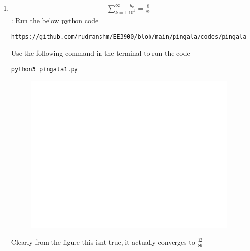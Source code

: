 \documentclass[journal,12pt,twocolumn]{IEEEtran}
\renewcommand\thesection{\arabic{section}}
\begin{document}
\begin{enumerate}[label=\thesection.\arabic*
,ref=\thesection.\theenumi]
\begin{figure}
\caption{}
\end{figure}
 \item 
\begin{align}
	\sum_{k=1}^{\infty}\frac{b_k}{10^k} =\frac{8}{89}
\end{align}
\solution:
Run the below python code 
\begin{lstlisting}
https://github.com/rudranshm/EE3900/blob/main/pingala/codes/pingala1.py
\end{lstlisting}
Use the following command in the terminal to run the code
\begin{lstlisting}
python3 pingala1.py
\end{lstlisting}
\begin{figure}
\centering
\includegraphics[width=\columnwidth]{1.4}
\caption{}
\end{figure}
Clearly from the figure this isnt true, it actually converges to $\frac{12}{89}$
\end{enumerate}
\end{document}
